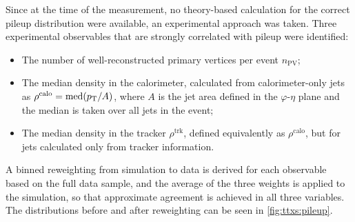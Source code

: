 Since at the time of the measurement, no theory-based calculation for the correct pileup distribution were available, an experimental approach was taken. Three experimental observables that are strongly correlated with pileup were identified: 

\begin{itemize}
    \item The number of well-reconstructed primary vertices per event $n_{\mathrm{PV}}$;
    \item The median \pt density in the calorimeter, calculated from calorimeter-only jets as $\rho^{\mathrm{calo}} = \mathrm{med} (p_{\mathrm{T}} / A)$, where $A$ is the jet area defined in the $\varphi$-$\eta$ plane and the median is taken over all jets in the event;
    \item The median \pt density in the tracker $\rho^{\mathrm{trk}}$, defined equivalently as $\rho^{\mathrm{calo}}$, but for jets calculated only from tracker information.
\end{itemize}

A binned reweighting from simulation to data is derived for each observable based on the full data sample, and the average of the three weights is applied to the simulation, so that approximate agreement is achieved in all three variables. The distributions before and after reweighting can be seen in \cref{fig:ttxs:pileup}.


